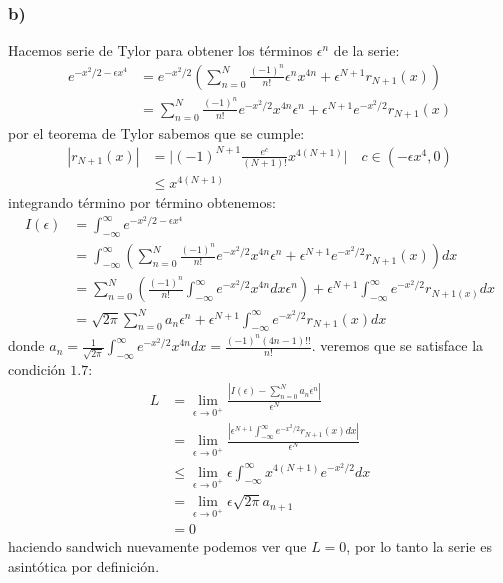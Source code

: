 \documentclass{article}
\begin{document}
\begin{tcolorbox}[breakable]
    \subsubsection*{b)}
    Hacemos serie de Tylor para obtener los términos $\epsilon^n$ de la serie:
    \begin{align*}
        e^{-x^2/2-\epsilon x^4} 
        &= e^{-x^2/2}\left( \sum_{n=0}^N \frac{(-1)^n}{n!} \epsilon^n x^{4n} + \epsilon^{N+1}r_{N+1}(x) \right) \\ 
        &= \sum_{n=0}^N \frac{(-1)^n}{n!} e^{-x^2/2} x^{4n} \epsilon^n  + \epsilon^{N+1} e^{-x^2/2} r_{N+1}(x) 
    \end{align*}
    por el teorema de Tylor sabemos que se cumple:
    \begin{align*}
        |r_{N+1}(x)| 
        &= \Big|(-1)^{N+1}\frac{e^c}{(N+1)!}x^{4(N+1)} \Big| \quad c \in (-\epsilon x^4,0) \\
        &\leq x^{4(N+1)}
    \end{align*}
    integrando término por término obtenemos:
    \begin{align*}
        I(\epsilon)
        &= \int_{-\infty}^\infty e^{-x^2/2-\epsilon x^4} \\
        &= \int_{-\infty}^\infty \left( \sum_{n=0}^N \frac{(-1)^n}{n!} e^{-x^2/2} x^{4n} \epsilon^n  + \epsilon^{N+1} e^{-x^2/2} r_{N+1}(x) \right)dx \\
        &= \sum_{n=0}^N \left( \frac{(-1)^n}{n!} \int_{-\infty}^\infty e^{-x^2/2}x^{4n}dx \epsilon^n \right)  + \epsilon^{N+1}\int_{-\infty}^\infty e^{-x^2/2}r_{N+1(x)} dx \\
        &= \sqrt{2\pi} \sum_{n=0}^N a_n \epsilon^n + \epsilon^{N+1}\int_{-\infty}^\infty e^{-x^2/2}r_{N+1}(x) dx 
    \end{align*}
    donde $a_n = \frac{1}{\sqrt{2\pi}} \int_{-\infty}^\infty e^{-x^2/2}x^{4n}dx = \frac{(-1)^n(4n-1)!!}{n!}$.
    veremos que se satisface la condición $1.7$:
    \begin{align*}
        L 
        &= \lim_{\epsilon \to 0^+} \frac{|I(\epsilon) - \sum_{n=0}^N a_n\epsilon^n|}{\epsilon^N} \\
        &= \lim_{\epsilon \to 0^+} \frac{|\epsilon^{N+1} \int_{-\infty}^\infty e^{-x^2/2}r_{N+1}(x)dx |}{\epsilon^N} \\
        &\leq \lim_{\epsilon \to 0^+} \epsilon \int_{-\infty}^\infty x^{4(N+1)}e^{-x^2/2}dx \\
        &= \lim_{\epsilon \to 0^+} \epsilon \sqrt{2\pi} a_{n+1} \\
        &= 0
    \end{align*}
    haciendo sandwich nuevamente podemos ver que $L=0$, por lo tanto la serie es asintótica por definición.

\end{tcolorbox}
\end{document}
